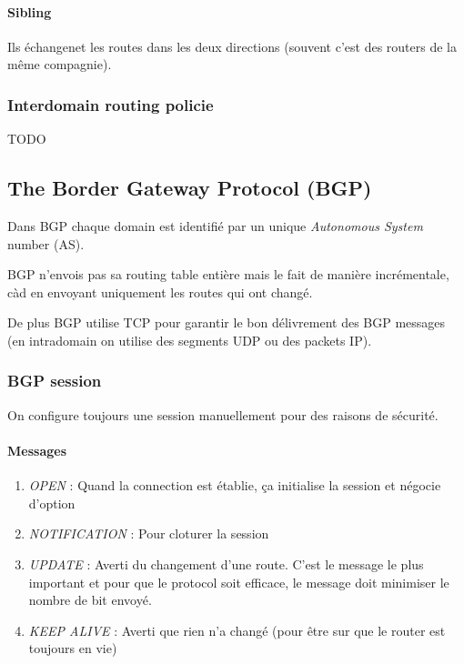 \paragraph{Sibling}
Ils échangenet les routes dans les deux directions (souvent c'est des routers
de la même compagnie).

\subsubsection{Interdomain routing policie}
TODO

\subsection{The Border Gateway Protocol (BGP)}
Dans BGP chaque domain est identifié par un unique \textit{Autonomous System} number (AS).

BGP n'envois pas sa routing table entière mais le fait de manière incrémentale, càd en
envoyant uniquement les routes qui ont changé.

De plus BGP utilise TCP pour garantir le bon délivrement des BGP messages (en intradomain on utilise des segments UDP ou des packets IP).

\subsubsection{BGP session}

On configure toujours une session manuellement pour des raisons de sécurité.

\paragraph{Messages}

\begin{enumerate}
    \item \textit{OPEN} : Quand la connection est établie, ça initialise la session et
        négocie d'option
    \item \textit{NOTIFICATION} : Pour cloturer la session
    \item \textit{UPDATE} : Averti du changement d'une route. C'est le message le plus important et pour que le protocol soit efficace, le message doit minimiser le nombre de bit envoyé.
    \item \textit{KEEP ALIVE} : Averti que rien n'a changé (pour être sur que le router
        est toujours en vie)
\end{enumerate}

